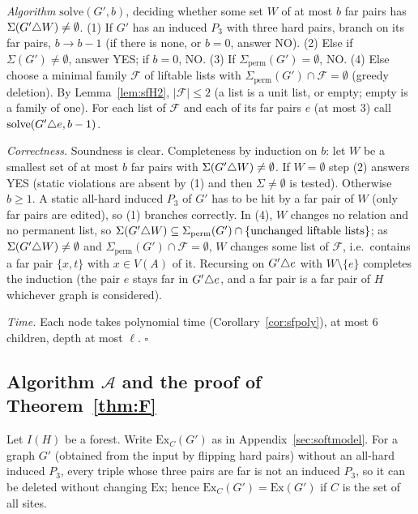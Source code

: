 \emph{Algorithm} $\mathrm{solve}(G',b)$, deciding whether some set $W$ of at most $b$ far pairs has $\Sigma(G'\triangle W)\ne\emptyset$.
(1) If $G'$ has an induced $P_3$ with three hard pairs, branch on its far pairs, $b\to b-1$ (if there is none, or $b=0$, answer NO).
(2) Else if $\Sigma(G')\ne\emptyset$, answer YES; if $b=0$, NO.
(3) If $\Sigma_{\mathrm{perm}}(G')=\emptyset$, NO.
(4) Else choose a minimal family $\mathcal F$ of liftable lists with $\Sigma_{\mathrm{perm}}(G')\cap\mathcal F=\emptyset$ (greedy deletion). By Lemma~\ref{lem:sfH2}, $|\mathcal F|\le2$ (a list is a unit list, or empty; empty is a family of one). For each list of $\mathcal F$ and each of its far pairs $e$ (at most $3$) call $\mathrm{solve}(G'\triangle e,b-1)$.

\emph{Correctness.} Soundness is clear. Completeness by induction on $b$: let $W$ be a smallest set of at most $b$ far pairs with $\Sigma(G'\triangle W)\ne\emptyset$. If $W=\emptyset$ step (2) answers YES (static violations are absent by (1) and then $\Sigma\ne\emptyset$ is tested). Otherwise $b\ge1$. A static all-hard induced $P_3$ of $G'$ has to be hit by a far pair of $W$ (only far pairs are edited), so (1) branches correctly. In (4), $W$ changes no relation and no permanent list, so $\Sigma(G'\triangle W)\subseteq\Sigma_{\mathrm{perm}}(G')\cap\{\text{unchanged liftable lists}\}$; as $\Sigma(G'\triangle W)\ne\emptyset$ and $\Sigma_{\mathrm{perm}}(G')\cap\mathcal F=\emptyset$, $W$ changes some list of $\mathcal F$, i.e.\ contains a far pair $\{x,t\}$ with $x\in V(A)$ of it. Recursing on $G'\triangle e$ with $W\setminus\{e\}$ completes the induction (the pair $e$ stays far in $G'\triangle e$, and a far pair is a far pair of $H$ whichever graph is considered).

\emph{Time.} Each node takes polynomial time (Corollary~\ref{cor:sfpoly}), at most $6$ children, depth at most $\ell$. \hfill$\square$

\subsection{Algorithm \texorpdfstring{$\mathcal A$}{A} and the proof of Theorem~\ref{thm:F}}\label{app:softF}
Let $I(H)$ be a forest. Write $\mathrm{Ex}_C(G')$ as in Appendix~\ref{sec:softmodel}. For a graph $G'$ (obtained from the input by flipping hard pairs) without an all-hard induced $P_3$, every triple whose three pairs are far is not an induced $P_3$, so it can be deleted without changing $\mathrm{Ex}$; hence $\mathrm{Ex}_C(G')=\mathrm{Ex}(G')$ if $C$ is the set of all sites.

